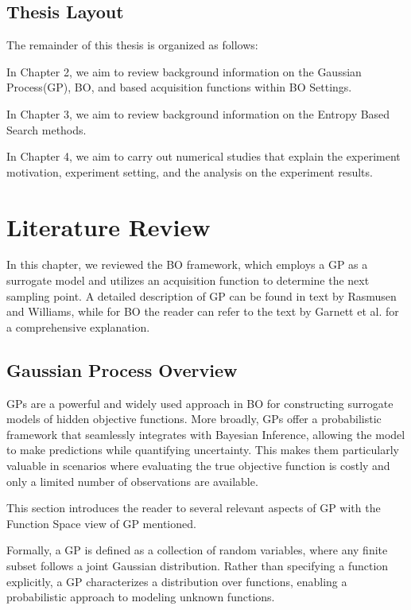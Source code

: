 \documentclass{ut-thesis}
\begin{document}
\section{Thesis Layout}
The remainder of this thesis is organized as follows:

In Chapter 2, we aim to review background information on the Gaussian Process(GP), BO, and based acquisition functions within BO Settings. 

In Chapter 3, we aim to review background information on the Entropy Based Search methods.

In Chapter 4, we aim to carry out numerical studies that explain the experiment motivation, experiment setting, and the analysis on the experiment results.


\chapter{Literature Review}

In this chapter, we reviewed the BO framework, which employs a GP as a surrogate model and utilizes an acquisition function to determine the next sampling point. A detailed description of GP can be found in text by Rasmusen and Williams\cite{rasmussen2006gaussian}, while for BO the reader can refer to the text by Garnett et al.\cite{garnett2023bayesian} for a comprehensive explanation.

\section{Gaussian Process Overview}

GPs are a powerful and widely used approach in BO for constructing surrogate models of hidden objective functions\cite{rasmussen2006gaussian}. More broadly, GPs offer a probabilistic framework that seamlessly integrates with Bayesian Inference, allowing the model to make predictions while quantifying uncertainty. This makes them particularly valuable in scenarios where evaluating the true objective function is costly and only a limited number of observations are available.

This section introduces the reader to several relevant aspects of GP with the Function Space view of GP mentioned.

Formally, a GP is defined as a collection of random variables, where any finite subset follows a joint Gaussian distribution. Rather than specifying a function explicitly, a GP characterizes a distribution over functions, enabling a probabilistic approach to modeling unknown functions\cite{rasmussen2006gaussian}.
\end{document}
